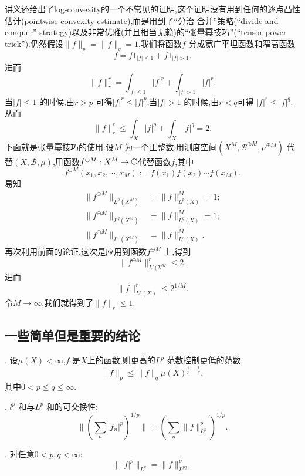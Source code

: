 讲义还给出了log-convexity的一个不常见的证明,这个证明没有用到任何的逐点凸性估计(pointwise convexity estimate),而是用到了``分治-合并''策略(``divide and conquer'' strategy)以及非常优雅(并且相当无赖)的``张量幂技巧''(``tensor power trick'').仍然假设$\|f\|_p=\|f\|_q=1$,我们将函数$f$ 分成宽广平坦函数和窄高函数
\[
f=f 1_{|f|\le 1}+f 1_{|f|>1}.
\] 
进而
\[
\|f\|_r^{r}=\int_{|f|\le 1}|f|^{r}+\int_{|f|>1}|f|^{r}.
\] 
当$|f|\le 1$ 的时候,由$r>p$ 可得$|f|^{r}\le |f|^{p}$;当$|f|>1$ 的时候,由$r<q$可得 $|f|^{r}\le |f|^{q}$.从而
\[
\|f\|_r^{r}\le \int_X |f|^{p}+\int_{X}|f|^{q}=2.
\] 
下面就是张量幂技巧的使用:设$M$ 为一个正整数,用测度空间$(X^{M},\mathcal{B}^{\oplus M},\mu^{\oplus M})$ 代替$(X,\mathcal{B},\mu)$,用函数$f^{\oplus M}:X^{M}\to \mathbb{C}$代替函数$f$,其中
 \[
   f^{\oplus M}(x_1,x_2,\cdots,x_M):=f(x_1)f(x_2)\cdots f(x_M).
\] 
易知
\begin{equation*}
  \begin{aligned}
    \|f^{\oplus M}\|_{L^{p}(X^{M})}&=\|f\|^{M}_{L^{p}(X)}=1;\\
    \|f^{\oplus M}\|_{L^{q}(X^{M})}&=\|f\|^{M}_{L^{q}(X)}=1;\\
    \|f^{\oplus M}\|_{L^{r}(X^{M})}&=\|f\|_{L^{r}(X)}^{M}.
  \end{aligned}
\end{equation*}
再次利用前面的论证,这次是应用到函数$f^{\oplus M}$ 上,得到
\[
  \|f^{\oplus M}\|^{r}_{L^{r}(X^{M}}\le 2.
\] 
进而
\[
  \|f\|^{r}_{L^{r}(X)}\le 2^{1 /M}.
\] 
令$M\to \infty$,我们就得到了$\|f\|_r\le 1$.
\subsection{一些简单但是重要的结论}
 \begin{framed}
      . 设$\mu\left( X \right)<\infty $,$f$ 是$X$上的函数,则更高的$L^{p}$ 范数控制更低的范数:
      \begin{equation}
	\|f\|_p\le \|f\|_q\mu(X)^{\frac{1}{p}-\frac{1}{q}},
      \end{equation}
      其中$0<p\le q\le \infty$.

     . $l^{p}$ 和与$L^{p}$ 和的可交换性:
     \begin{equation}
       \|\left( \sum_{n}^{} |f_n|^{p} \right) ^{1 /p}\|=\left( \sum_{n}^{} \|f\|_{L^{p}}^{p} \right) ^{1 /p}.
     \end{equation}

     . 对任意$0<p,q<\infty$:
     \begin{equation}
       \| |f|^{p}\|_{L^{q}}=\| f\|^{p}_{L^{pq}}.
     \end{equation}
\end{framed}

